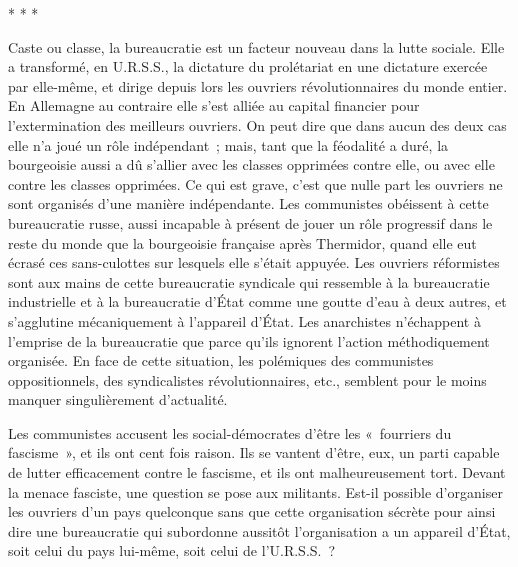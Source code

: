 \documentclass[french,twoside]{book} %
\begin{document}
\begin{center}
* * *\end{center}
\noindent Caste ou classe, la bureaucratie est un facteur nouveau dans la lutte sociale. Elle a transformé, en U.R.S.S., la dictature du prolétariat en une dictature exercée par elle-même, et dirige depuis lors les ouvriers révolutionnaires du monde entier. En Allemagne au contraire elle s'est alliée au capital financier pour l'extermination des meilleurs ouvriers. On peut dire que dans aucun des deux cas elle n'a joué un rôle indépendant ; mais, tant que la féodalité a duré, la bourgeoisie aussi a dû s'allier avec les classes opprimées contre elle, ou avec elle contre les classes opprimées. Ce qui est grave, c'est que nulle part les ouvriers ne sont organisés d'une manière indépendante. Les communistes obéissent à cette bureaucratie russe, aussi incapable à présent de jouer un rôle progressif dans le reste du monde que la bourgeoisie française après Thermidor, quand elle eut écrasé ces sans-culottes sur lesquels elle s'était appuyée. Les ouvriers réformistes sont aux mains de cette bureaucratie syndicale qui ressemble à la bureaucratie industrielle et à la bureaucratie d'État comme une goutte d'eau à deux autres, et s'agglutine mécaniquement à l'appareil d'État. Les anarchistes n'échappent à l'emprise de la bureaucratie que parce qu'ils ignorent l'action méthodiquement organisée. En face de cette situation, les polémiques des communistes oppositionnels, des syndicalistes révolutionnaires, etc., semblent pour le moins manquer singulièrement d'actualité.\par
Les communistes accusent les social-démocrates d'être les « fourriers du fascisme », et ils ont cent fois raison. Ils se vantent d'être, eux, un parti capable de lutter efficacement contre le fascisme, et ils ont malheureusement tort. Devant la menace fasciste, une question se pose aux militants. Est-il possible d'organiser les ouvriers d'un pays quelconque sans que cette organisation sécrète pour ainsi dire une bureaucratie qui subordonne aussitôt l'organisation a un appareil d'État, soit celui du pays lui-même, soit celui de l'U.R.S.S. ?\par
\end{document}
